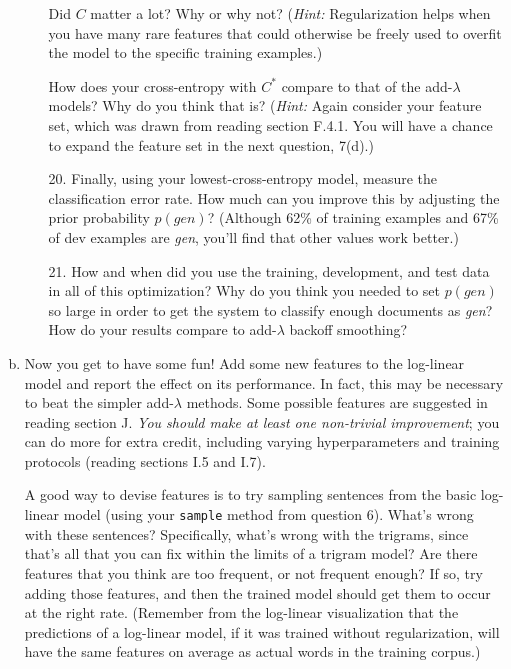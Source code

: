 \documentclass[12pt]{article}
\theoremstyle{plain}
\theoremstyle{definition}
\theoremstyle{remark}
\begin{document}
\begin{enumerate}[(a)]
\begin{enumerate}
Did $C$ matter a lot? Why or why not? (\textit{Hint:} Regularization helps when you have many rare features that could otherwise be freely used to overfit the model to the specific training examples.)

How does your cross-entropy with $C^*$ compare to that of the add-$\lambda$ models? Why do you think that is? (\textit{Hint:} Again consider your feature set, which was drawn from reading section F.4.1. You will have a chance to expand the feature set in the next question, 7(d).)

\item[20.] Finally, using your lowest-cross-entropy model, measure the classification error rate. How much can you improve this by adjusting the prior probability $p(\textit{gen})$? (Although 62\% of training examples and 67\% of dev examples are \textit{gen}, you’ll find that other values work better.)

\item[21.] How and when did you use the training, development, and test data in all of this optimization? Why do you think you needed to set $p(\textit{gen})$ so large in order to get the system to classify enough documents as \textit{gen}? How do your results compare to add-$\lambda$ backoff smoothing?
\end{enumerate}

\item Now you get to have some fun! Add some new features to the log-linear model and report the effect on its performance. In fact, this may be necessary to beat the simpler add-$\lambda$ methods. Some possible features are suggested in reading section J. \textit{You should make at least one non-trivial improvement}; you can do more for extra credit, including varying hyperparameters and training protocols (reading sections I.5 and I.7).

A good way to devise features is to try sampling sentences from the basic log-linear model (using your \texttt{sample} method from question 6). What’s wrong with these sentences? Specifically, what’s wrong with the trigrams, since that’s all that you can fix within the limits of a trigram model? Are there features that you think are too frequent, or not frequent enough? If so, try adding those features, and then the trained model should get them to occur at the right rate. (Remember from the log-linear visualization that the predictions of a log-linear model, if it was trained without regularization, will have the same features on average as actual words in the training corpus.)


\end{enumerate}
\end{document}

